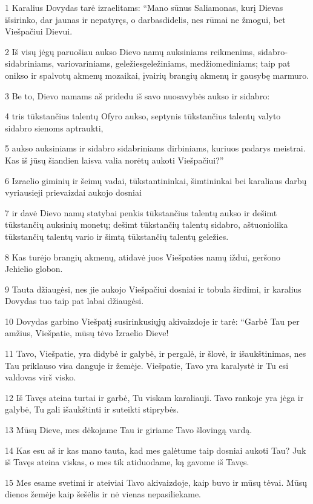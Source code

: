 \par 1 Karalius Dovydas tarė izraelitams: “Mano sūnus Saliamonas, kurį Dievas išsirinko, dar jaunas ir nepatyręs, o darbas­didelis, nes rūmai ne žmogui, bet Viešpačiui Dievui. 
\par 2 Iš visų jėgų paruošiau aukso Dievo namų auksiniams reikmenims, sidabro­sidabriniams, vario­variniams, geležies­geležiniams, medžio­mediniams; taip pat onikso ir spalvotų akmenų mozaikai, įvairių brangių akmenų ir gausybę marmuro. 
\par 3 Be to, Dievo namams aš pridedu iš savo nuosavybės aukso ir sidabro: 
\par 4 tris tūkstančius talentų Ofyro aukso, septynis tūkstančius talentų valyto sidabro sienoms aptraukti, 
\par 5 aukso auksiniams ir sidabro sidabriniams dirbiniams, kuriuos padarys meistrai. Kas iš jūsų šiandien laisva valia norėtų aukoti Viešpačiui?” 
\par 6 Izraelio giminių ir šeimų vadai, tūkstantininkai, šimtininkai bei karaliaus darbų vyriausieji prievaizdai aukojo dosniai 
\par 7 ir davė Dievo namų statybai penkis tūkstančius talentų aukso ir dešimt tūkstančių auksinių monetų; dešimt tūkstančių talentų sidabro, aštuoniolika tūkstančių talentų vario ir šimtą tūkstančių talentų geležies. 
\par 8 Kas turėjo brangių akmenų, atidavė juos Viešpaties namų iždui, geršono Jehielio globon. 
\par 9 Tauta džiaugėsi, nes jie aukojo Viešpačiui dosniai ir tobula širdimi, ir karalius Dovydas tuo taip pat labai džiaugėsi. 
\par 10 Dovydas garbino Viešpatį susirinkusiųjų akivaizdoje ir tarė: “Garbė Tau per amžius, Viešpatie, mūsų tėvo Izraelio Dieve! 
\par 11 Tavo, Viešpatie, yra didybė ir galybė, ir pergalė, ir šlovė, ir išaukštinimas, nes Tau priklauso visa danguje ir žemėje. Viešpatie, Tavo yra karalystė ir Tu esi valdovas virš visko. 
\par 12 Iš Tavęs ateina turtai ir garbė, Tu viskam karaliauji. Tavo rankoje yra jėga ir galybė, Tu gali išaukštinti ir suteikti stiprybės. 
\par 13 Mūsų Dieve, mes dėkojame Tau ir giriame Tavo šlovingą vardą. 
\par 14 Kas esu aš ir kas mano tauta, kad mes galėtume taip dosniai aukoti Tau? Juk iš Tavęs ateina viskas, o mes tik atiduodame, ką gavome iš Tavęs. 
\par 15 Mes esame svetimi ir ateiviai Tavo akivaizdoje, kaip buvo ir mūsų tėvai. Mūsų dienos žemėje kaip šešėlis ir nė vienas nepasiliekame. 
